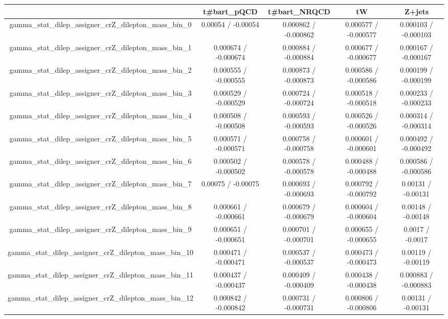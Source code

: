 \documentclass[10pt]{article}
\begin{document}
\begin{table}[htbp]
\begin{center}
\begin{tabular}{|c|c|c|c|c|}
\hline 
      & t#bar{t}_{pQCD}      & t#bar{t}_{NRQCD}      & tW      & Z+jets \\ 
\hline 
  gamma_stat_dilep_assigner_crZ_dilepton_mass_bin_0 & 0.00054 / -0.00054 & 0.000862 / -0.000862 & 0.000577 / -0.000577 & 0.000103 / -0.000103 \\ 
  gamma_stat_dilep_assigner_crZ_dilepton_mass_bin_1 & 0.000674 / -0.000674 & 0.000884 / -0.000884 & 0.000677 / -0.000677 & 0.000167 / -0.000167 \\ 
  gamma_stat_dilep_assigner_crZ_dilepton_mass_bin_2 & 0.000555 / -0.000555 & 0.000873 / -0.000873 & 0.000586 / -0.000586 & 0.000199 / -0.000199 \\ 
  gamma_stat_dilep_assigner_crZ_dilepton_mass_bin_3 & 0.000529 / -0.000529 & 0.000724 / -0.000724 & 0.000518 / -0.000518 & 0.000233 / -0.000233 \\ 
  gamma_stat_dilep_assigner_crZ_dilepton_mass_bin_4 & 0.000508 / -0.000508 & 0.000593 / -0.000593 & 0.000526 / -0.000526 & 0.000314 / -0.000314 \\ 
  gamma_stat_dilep_assigner_crZ_dilepton_mass_bin_5 & 0.000571 / -0.000571 & 0.000758 / -0.000758 & 0.000601 / -0.000601 & 0.000492 / -0.000492 \\ 
  gamma_stat_dilep_assigner_crZ_dilepton_mass_bin_6 & 0.000502 / -0.000502 & 0.000578 / -0.000578 & 0.000488 / -0.000488 & 0.000586 / -0.000586 \\ 
  gamma_stat_dilep_assigner_crZ_dilepton_mass_bin_7 & 0.00075 / -0.00075 & 0.000693 / -0.000693 & 0.000792 / -0.000792 & 0.00131 / -0.00131 \\ 
  gamma_stat_dilep_assigner_crZ_dilepton_mass_bin_8 & 0.000661 / -0.000661 & 0.000679 / -0.000679 & 0.000604 / -0.000604 & 0.00148 / -0.00148 \\ 
  gamma_stat_dilep_assigner_crZ_dilepton_mass_bin_9 & 0.000651 / -0.000651 & 0.000701 / -0.000701 & 0.000655 / -0.000655 & 0.0017 / -0.0017 \\ 
  gamma_stat_dilep_assigner_crZ_dilepton_mass_bin_10 & 0.000471 / -0.000471 & 0.000537 / -0.000537 & 0.000473 / -0.000473 & 0.00119 / -0.00119 \\ 
  gamma_stat_dilep_assigner_crZ_dilepton_mass_bin_11 & 0.000437 / -0.000437 & 0.000409 / -0.000409 & 0.000438 / -0.000438 & 0.000883 / -0.000883 \\ 
  gamma_stat_dilep_assigner_crZ_dilepton_mass_bin_12 & 0.000842 / -0.000842 & 0.000731 / -0.000731 & 0.000806 / -0.000806 & 0.00131 / -0.00131 \\ 

\end{tabular}
\end{center}
\end{table}
\end{document}

